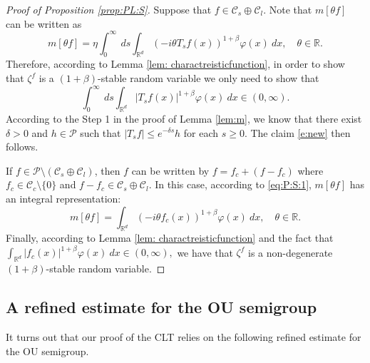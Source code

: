 \documentclass[EJP]{ejpecp} %
\begin{document}
\begin{proof}[Proof of Proposition \ref{prop:PL:S}]
	Suppose that $f\in \mathcal C_s \oplus \mathcal C_l$.
	Note that $m[\theta f]$ can be written as
\begin{equation}
    \label{eq:PL:S:1}
    m[\theta f]
    = \eta \int_0^{\infty}~ds\int_{\mathbb R^d} (-i\theta T_s f(x))^{1+\beta} \varphi(x)~dx,
    \quad \theta \in \mathbb R.
\end{equation}
	Therefore, according to Lemma \ref{lem: charactreisticfunction}, in order to show that $\zeta^f$ is a $(1+\beta)$-stable random variable we only need to show that
\begin{equation}\label{e:new}
    \int_0^{\infty}~ds\int_{\mathbb R^d} | T_{s} f(x)|^{1+\beta} \varphi(x)~dx
    \in (0, \infty).
\end{equation}
	According to the Step 1 in the proof of Lemma \ref{lem:m}, we know that there exist $\delta> 0$ and $h \in \mathcal P$ such that $|T_sf| \leq e^{- \delta s} h$ for each $s\geq 0$.
	The claim \eqref{e:new} then follows.

	If $f \in \mathcal P \setminus (\mathcal C_s \oplus \mathcal C_l)$, then $f$ can be written by $f = f_c +(f - f_c)$ where $f_c \in \mathcal C_c\setminus\{0\}$ and $f - f_c \in \mathcal C_s \oplus \mathcal C_l$.
	In this case, according to \eqref{eq:P:S:1}, $m[\theta f]$ has an integral representation:
\begin{equation}
\label{eq:PL:S:2}
    m[\theta f]
    = \int_{\mathbb R^d} (-i\theta f_c(x))^{1+\beta} \varphi(x) ~dx,
    \quad \theta \in \mathbb R.
\end{equation}
	Finally, according to Lemma \ref{lem: charactreisticfunction} and the fact that $\int_{\mathbb R^d} | f_c(x)|^{1+\beta} \varphi(x)~dx \in (0, \infty),$
	we have that $\zeta^f$ is a non-degenerate $(1+\beta)$-stable random variable.
\end{proof}

\subsection{A refined estimate for the OU semigroup}\label{sc:refined}
	It turns out that our proof of the CLT relies on the following refined estimate for the OU semigroup.
\end{document}
